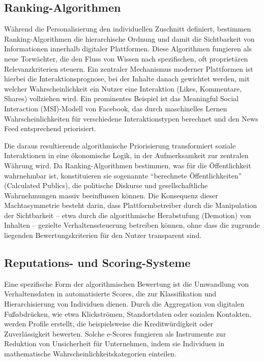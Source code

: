 \subsection{Ranking-Algorithmen}

Während die Personalisierung den individuellen Zuschnitt definiert, bestimmen Ranking-Algorithmen die hierarchische Ordnung und damit die Sichtbarkeit von Informationen innerhalb digitaler Plattformen. Diese Algorithmen fungieren als neue Torwächter, die den Fluss von Wissen nach spezifischen, oft proprietären Relevanzkriterien steuern. Ein zentraler Mechanismus moderner Plattformen ist hierbei die Interaktionsprognose, bei der Inhalte danach gewichtet werden, mit welcher Wahrscheinlichkeit ein Nutzer eine Interaktion (Likes, Kommentare, Shares) vollziehen wird. Ein prominentes Beispiel ist das Meaningful Social Interaction (MSI)-Modell von Facebook, das durch maschinelles Lernen Wahrscheinlichkeiten für verschiedene Interaktionstypen berechnet und den News Feed entsprechend priorisiert.

Die daraus resultierende algorithmische Priorisierung transformiert soziale Interaktionen in eine ökonomische Logik, in der Aufmerksamkeit zur zentralen Währung wird. Da Ranking-Algorithmen bestimmen, was für die Öffentlichkeit wahrnehmbar ist, konstituieren sie sogenannte \enquote{berechnete Öffentlichkeiten} (Calculated Publics), die politische Diskurse und gesellschaftliche Wahrnehmungen massiv beeinflussen können. Die Konsequenz dieser Machtasymmetrie besteht darin, dass Plattformbetreiber durch die Manipulation der Sichtbarkeit -- etwa durch die algorithmische Herabstufung (Demotion) von Inhalten -- gezielte Verhaltenssteuerung betreiben können, ohne dass die zugrunde liegenden Bewertungskriterien für den Nutzer transparent sind.

\subsection{Reputations- und Scoring-Systeme}

Eine spezifische Form der algorithmischen Bewertung ist die Umwandlung von Verhaltensdaten in automatisierte Scores, die zur Klassifikation und Hierarchisierung von Individuen dienen. Durch die Aggregation von digitalen Fußabdrücken, wie etwa Klickströmen, Standortdaten oder sozialen Kontakten, werden Profile erstellt, die beispielsweise die Kreditwürdigkeit oder Zuverlässigkeit bewerten. Solche e-Scores fungieren als Instrumente zur Reduktion von Unsicherheit für Unternehmen, indem sie Individuen in mathematische Wahrscheinlichkeitskategorien einteilen.

